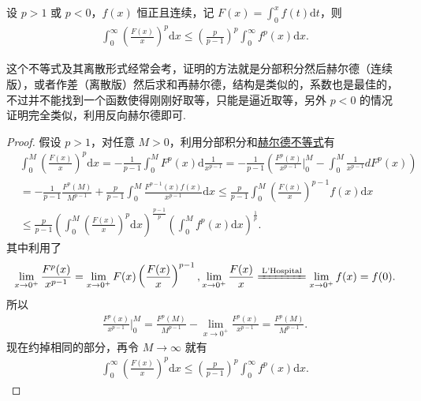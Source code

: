 \documentclass[../../main.tex]{subfiles}
\begin{document}
\begin{theorem}[Hardy不等式]\label{theorem:Hardy(哈代)不等式}
设 $p > 1$ 或 $p < 0$，$f(x)$ 恒正且连续，记 $F(x) = \int_0^x f(t) \mathrm{d}t$，则
\begin{align*}
\int_0^\infty \left( \frac{F(x)}{x} \right)^p \mathrm{d}x \leqslant \left( \frac{p}{p - 1} \right)^p \int_0^\infty f^p(x) \mathrm{d}x.
\end{align*}
\end{theorem}
\begin{remark}
这个不等式及其离散形式经常会考，证明的方法就是分部积分然后赫尔德（连续版），或者作差（离散版）然后求和再赫尔德，结构是类似的，系数也是最佳的，不过并不能找到一个函数使得刚刚好取等，只能是逼近取等，另外 $p < 0$ 的情况证明完全类似，利用反向赫尔德即可.
\end{remark}
\begin{proof}
假设 $p > 1$，对任意 $M > 0$，利用分部积分和\hyperref[theorem:Hold(赫尔德)不等式(积分形式)]{赫尔德不等式}有
\begin{align*}
&\int_0^M \left( \frac{F(x)}{x} \right)^p \mathrm{d}x = -\frac{1}{p - 1} \int_0^M F^p(x) \mathrm{d}\frac{1}{x^{p - 1}} = -\frac{1}{p - 1} \left( \frac{F^p(x)}{x^{p - 1}} \bigg|_0^M - \int_0^M \frac{1}{x^{p - 1}} dF^p(x) \right)
\\
&= -\frac{1}{p - 1} \frac{F^p(M)}{M^{p - 1}} + \frac{p}{p - 1} \int_0^M \frac{F^{p - 1}(x) f(x)}{x^{p - 1}} \mathrm{d}x \leqslant \frac{p}{p - 1} \int_0^M \left( \frac{F(x)}{x} \right)^{p - 1} f(x) \mathrm{d}x
\\
&\leqslant \frac{p}{p - 1} \left( \int_0^M \left( \frac{F(x)}{x} \right)^p \mathrm{d}x \right)^{\frac{p - 1}{p}} \left( \int_0^M f^p(x) \mathrm{d}x \right)^{\frac{1}{p}}.
\end{align*}
其中利用了
\begin{align*}
\lim_{x \to 0^+} \frac{F^p(x)}{x^{p - 1}} = \lim_{x \to 0^+} F(x) \left( \frac{F(x)}{x} \right)^{p - 1}, \lim_{x \to 0^+} \frac{F(x)}{x} \xlongequal{\text{L'Hospital}} \lim_{x \to 0^+} f(x) = f(0).
\end{align*}
所以
\begin{align*}
\frac{F^p(x)}{x^{p - 1}} \bigg|_0^M = \frac{F^p(M)}{M^{p - 1}} - \lim_{x \to 0^+} \frac{F^p(x)}{x^{p - 1}} = \frac{F^p(M)}{M^{p - 1}}.
\end{align*}
现在约掉相同的部分，再令 $M \to \infty$ 就有
\begin{align*}
\int_0^\infty \left( \frac{F(x)}{x} \right)^p \mathrm{d}x \leqslant \left( \frac{p}{p - 1} \right)^p \int_0^\infty f^p(x) \mathrm{d}x.
\end{align*}
\end{proof}
\end{document}
